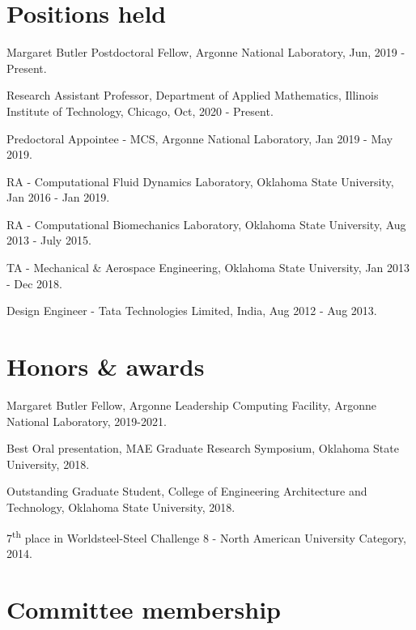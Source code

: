 \documentclass[letterpaper]{article}
\renewenvironment{itemize}{
  \begin{list}{}{
    \setlength{\leftmargin}{1.5em}
  }
}{
  \end{list}
}
\begin{document}
\section*{Positions held}
\begin{itemize}
\item Margaret Butler Postdoctoral Fellow, Argonne National Laboratory, Jun, 2019 - Present.
\item Research Assistant Professor, Department of Applied Mathematics, Illinois Institute of Technology, Chicago, Oct, 2020 - Present.
\item Predoctoral Appointee - MCS, Argonne National Laboratory, Jan 2019 - May 2019.
\item RA - Computational Fluid Dynamics Laboratory, Oklahoma State University, Jan 2016 - Jan 2019.
\item RA - Computational Biomechanics Laboratory, Oklahoma State University, Aug 2013 - July 2015.
\item TA - Mechanical \& Aerospace Engineering, Oklahoma State University, Jan 2013 - Dec 2018.
\item Design Engineer - Tata Technologies Limited, India, Aug 2012 - Aug 2013.
\end{itemize}

\section*{Honors \& awards}

\begin{itemize}

\item Margaret Butler Fellow, Argonne Leadership Computing Facility, Argonne National Laboratory, 2019-2021.

\item Best Oral presentation, MAE Graduate Research Symposium, Oklahoma State University, 2018.

\item Outstanding Graduate Student, College of Engineering Architecture and Technology, Oklahoma State University, 2018.

\item 7\textsuperscript{th} place in Worldsteel-Steel Challenge 8 - North American University Category, 2014.

\end{itemize}

\section*{Committee membership}
\end{document}
